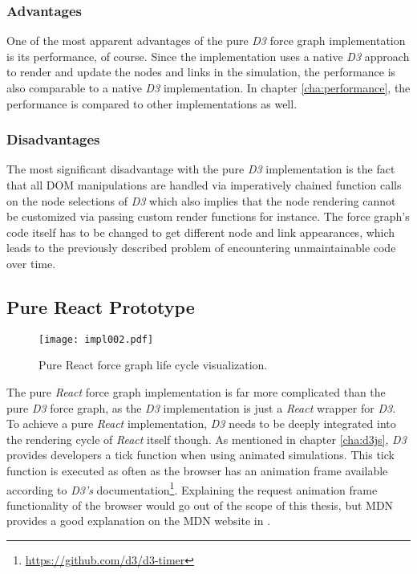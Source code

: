 \subsubsection{Advantages}

One of the most apparent advantages of the pure \emph{D3} force graph implementation is its performance, of course. Since the implementation uses a native \emph{D3} approach to render and update the nodes and links in the simulation, the performance is also comparable to a native \emph{D3} implementation. In chapter \ref{cha:performance}, the performance is compared to other implementations as well.

\subsubsection{Disadvantages}

The most significant disadvantage with the pure \emph{D3} implementation is the fact that all DOM manipulations are handled via imperatively chained function calls on the node selections of \emph{D3} which also implies that the node rendering cannot be customized via passing custom render functions for instance. The force graph's code itself has to be changed to get different node and link appearances, which leads to the previously described problem of encountering unmaintainable code over time.


\subsection{Pure React Prototype}
\label{sec:pureReactPrototype}

\begin{figure}
\centering
\texttt{[image: impl002.pdf]}
\caption{Pure React force graph life cycle visualization.}
\label{fig:pureReactLifecycle}
\end{figure}

The pure \emph{React} force graph implementation is far more complicated than the pure \emph{D3} force graph, as the \emph{D3} implementation is just a \emph{React} wrapper for \emph{D3}. To achieve a pure \emph{React} implementation, \emph{D3} needs to be deeply integrated into the rendering cycle of \emph{React} itself though. As mentioned in chapter \ref{cha:d3js}, \emph{D3} provides developers a tick function when using animated simulations. This tick function is executed as often as the browser has an animation frame available according to \emph{D3's} documentation\footnote{\url{https://github.com/d3/d3-timer}}. Explaining the request animation frame functionality of the browser would go out of the scope of this thesis, but MDN provides a good explanation on the MDN website in \cite{RAF}.

